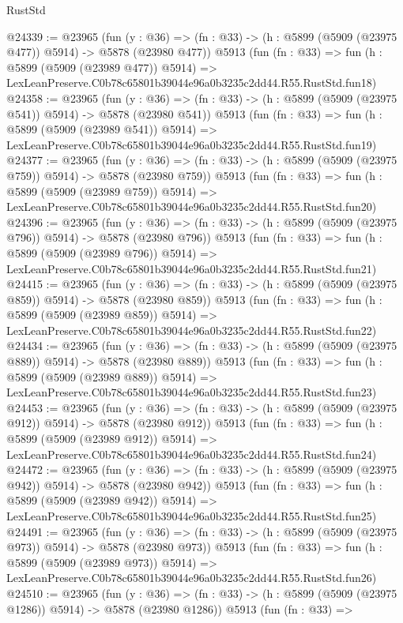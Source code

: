 \begin{lexlean}{RustStd}
\begin{coremodule}
{{@24339 := @23965
    (fun (y : @36) => (fn : @33) -> (h : @5899 (@5909 (@23975 @477)) @5914) -> @5878 (@23980 @477))
    @5913
    (fun (fn : @33) =>
    fun (h : @5899 (@5909 (@23989 @477)) @5914) =>
    LexLeanPreserve.C0b78c65801b39044e96a0b3235c2dd44.R55.RustStd.fun18)
@24358 := @23965
    (fun (y : @36) => (fn : @33) -> (h : @5899 (@5909 (@23975 @541)) @5914) -> @5878 (@23980 @541))
    @5913
    (fun (fn : @33) =>
    fun (h : @5899 (@5909 (@23989 @541)) @5914) =>
    LexLeanPreserve.C0b78c65801b39044e96a0b3235c2dd44.R55.RustStd.fun19)
@24377 := @23965
    (fun (y : @36) => (fn : @33) -> (h : @5899 (@5909 (@23975 @759)) @5914) -> @5878 (@23980 @759))
    @5913
    (fun (fn : @33) =>
    fun (h : @5899 (@5909 (@23989 @759)) @5914) =>
    LexLeanPreserve.C0b78c65801b39044e96a0b3235c2dd44.R55.RustStd.fun20)
@24396 := @23965
    (fun (y : @36) => (fn : @33) -> (h : @5899 (@5909 (@23975 @796)) @5914) -> @5878 (@23980 @796))
    @5913
    (fun (fn : @33) =>
    fun (h : @5899 (@5909 (@23989 @796)) @5914) =>
    LexLeanPreserve.C0b78c65801b39044e96a0b3235c2dd44.R55.RustStd.fun21)
@24415 := @23965
    (fun (y : @36) => (fn : @33) -> (h : @5899 (@5909 (@23975 @859)) @5914) -> @5878 (@23980 @859))
    @5913
    (fun (fn : @33) =>
    fun (h : @5899 (@5909 (@23989 @859)) @5914) =>
    LexLeanPreserve.C0b78c65801b39044e96a0b3235c2dd44.R55.RustStd.fun22)
@24434 := @23965
    (fun (y : @36) => (fn : @33) -> (h : @5899 (@5909 (@23975 @889)) @5914) -> @5878 (@23980 @889))
    @5913
    (fun (fn : @33) =>
    fun (h : @5899 (@5909 (@23989 @889)) @5914) =>
    LexLeanPreserve.C0b78c65801b39044e96a0b3235c2dd44.R55.RustStd.fun23)
@24453 := @23965
    (fun (y : @36) => (fn : @33) -> (h : @5899 (@5909 (@23975 @912)) @5914) -> @5878 (@23980 @912))
    @5913
    (fun (fn : @33) =>
    fun (h : @5899 (@5909 (@23989 @912)) @5914) =>
    LexLeanPreserve.C0b78c65801b39044e96a0b3235c2dd44.R55.RustStd.fun24)
@24472 := @23965
    (fun (y : @36) => (fn : @33) -> (h : @5899 (@5909 (@23975 @942)) @5914) -> @5878 (@23980 @942))
    @5913
    (fun (fn : @33) =>
    fun (h : @5899 (@5909 (@23989 @942)) @5914) =>
    LexLeanPreserve.C0b78c65801b39044e96a0b3235c2dd44.R55.RustStd.fun25)
@24491 := @23965
    (fun (y : @36) => (fn : @33) -> (h : @5899 (@5909 (@23975 @973)) @5914) -> @5878 (@23980 @973))
    @5913
    (fun (fn : @33) =>
    fun (h : @5899 (@5909 (@23989 @973)) @5914) =>
    LexLeanPreserve.C0b78c65801b39044e96a0b3235c2dd44.R55.RustStd.fun26)
@24510 := @23965
    (fun (y : @36) =>
    (fn : @33) -> (h : @5899 (@5909 (@23975 @1286)) @5914) -> @5878 (@23980 @1286))
    @5913
    (fun (fn : @33) =>
}}
\end{coremodule}
\end{lexlean}
